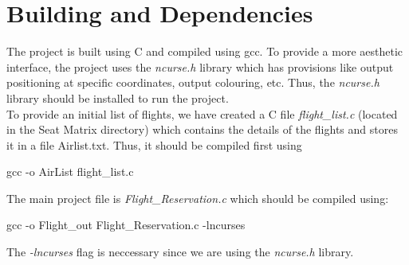 \documentclass[a4paper]{scrartcl}
\begin{document}
\section{Building and Dependencies}
The project is built using C and compiled using gcc. To provide a more aesthetic interface, the project uses the \textit{ncurse.h} library which has provisions like output positioning at specific coordinates, output colouring, etc. Thus, the \textit{ncurse.h} library should be installed to run the project.\\[0.3cm]
To provide an initial list of flights, we have created a C file \textit{flight\_list.c} (located in the Seat Matrix directory) which contains the details of the flights and stores it in a file Airlist.txt. Thus, it should be compiled first using 
\begin{center}
    gcc -o AirList flight\_list.c
\end{center}
The main project file is \textit{Flight\_Reservation.c} which should be compiled using: 
\begin{center}
    gcc -o Flight\_out Flight\_Reservation.c -lncurses
\end{center}
The \textit{-lncurses} flag is neccessary since we are using the \textit{ncurse.h} library.\\[0.3cm]
\end{document}
